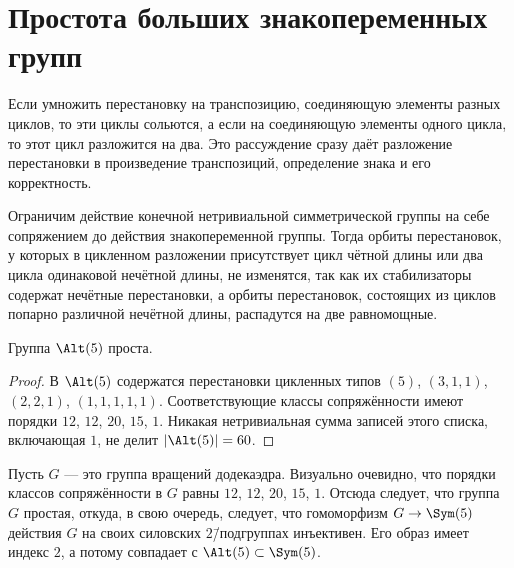 \documentclass[
	extrafontsizes,
	11pt,
	hyphens,
]{memoir}
\begin{document}
\section{Простота больших знакопеременных групп}

\begin{observation}
Если умножить перестановку на транспозицию, соединяющую элементы разных циклов, то эти
циклы сольются, а если на соединяющую элементы одного цикла, то этот цикл
разложится на два. Это рассуждение сразу даёт
разложение перестановки в произведение транспозиций, определение знака и его корректность.
\end{observation}

\begin{observation} \label{obs:AltConjClasses}
Ограничим действие конечной нетривиальной симметрической группы на себе сопряжением до действия знакопеременной группы.
Тогда орбиты перестановок, у которых в цикленном разложении присутствует цикл чётной длины или два цикла одинаковой нечётной длины, не изменятся,
так как
их стабилизаторы содержат нечётные перестановки,
а орбиты перестановок, состоящих из циклов попарно различной нечётной длины, распадутся на две равномощные.
\end{observation}

\begin{lemma} \label{lem:AltFiveSimple}
Группа \(\Alt(5)\) проста.
\end{lemma}

\begin{proof}
В \(\Alt(5)\) содержатся перестановки цикленных типов
\((5)\), \((3,1,1)\), \((2,2,1)\), \((1,1,1,1,1)\).
Соответствующие классы сопряжённости имеют порядки
\(12\), \(12\), \(20\), \(15\), \(1\). Никакая нетривиальная сумма записей этого списка, включающая \(1\), не делит \(\lvert \Alt(5) \rvert = 60\).
\end{proof}

\begin{observation}
Пусть \(G\) --- это группа вращений додекаэдра.
Визуально очевидно, что порядки классов сопряжённости в \(G\) равны \(12\), \(12\), \(20\), \(15\), \(1\).
Отсюда следует, что группа \(G\) простая, откуда, в свою очередь, следует, что гомоморфизм \(G \to \Sym(5)\) действия \(G\) на своих силовских \(2\)\=/подгруппах инъективен. Его образ имеет индекс \(2\), а потому совпадает с \(\Alt(5) \subset \Sym(5)\).
\end{observation}
\end{document}
